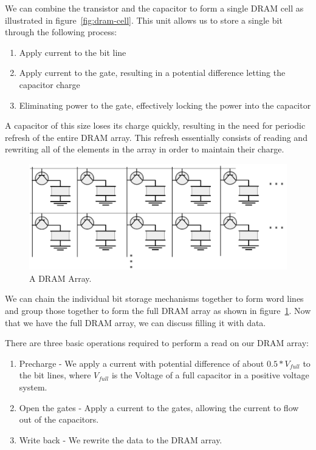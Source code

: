 We can combine the transistor and the capacitor to form a single DRAM cell as illustrated in figure~\ref{fig:dram-cell}. This unit allows us to store a single bit through the following process:
\begin{enumerate}
  \item Apply current to the bit line
  \item Apply current to the gate, resulting in a potential difference letting the capacitor charge
  \item Eliminating power to the gate, effectively locking the power into the capacitor
\end{enumerate}
A capacitor of this size loses its charge quickly, resulting in the need for periodic refresh of the entire DRAM array. This refresh essentially consists of reading and rewriting all of the elements in the array in order to maintain their charge.

\begin{figure}
  \centering
  \includegraphics[scale=0.5]{assets/dram_arr.png}

  \caption{A DRAM Array.}
  \label{fig:dram-array}
\end{figure}
We can chain the individual bit storage mechanisms together to form word lines and group those together to form the full DRAM array as shown in figure~\ref{fig:dram-array}. Now that we have the full DRAM array, we can discuss filling it with data.

There are three basic operations required to perform a read on our DRAM array:
\begin{enumerate}
  \item Precharge - We apply a current with potential difference of about $0.5 * V_{full}$ to the bit lines, where $V_{full}$ is the Voltage of a full capacitor in a positive voltage system.
  \item Open the gates - Apply a current to the gates, allowing the current to flow out of the capacitors.
  \item Write back - We rewrite the data to the DRAM array.
\end{enumerate}

